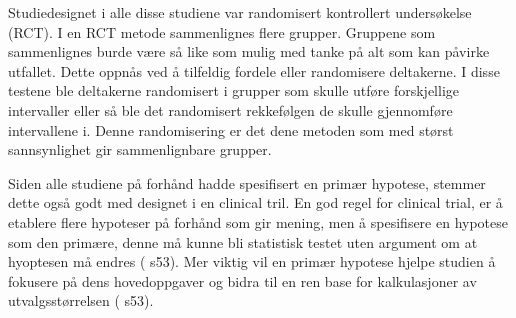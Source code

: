 \documentclass[
]{book}
\begin{document}
Studiedesignet i alle disse studiene var randomisert kontrollert undersøkelse (RCT). I en RCT metode sammenlignes flere grupper. Gruppene som sammenlignes burde være så like som mulig med tanke på alt som kan påvirke utfallet. Dette oppnås ved å tilfeldig fordele eller randomisere deltakerne. I disse testene ble deltakerne randomisert i grupper som skulle utføre forskjellige intervaller eller så ble det randomisert rekkefølgen de skulle gjennomføre intervallene i. Denne randomisering er det dene metoden som med størst sannsynlighet gir sammenlignbare grupper.

Siden alle studiene på forhånd hadde spesifisert en primær hypotese, stemmer dette også godt med designet i en clinical tril. En god regel for clinical trial, er å etablere flere hypoteser på forhånd som gir mening, men å spesifisere en hypotese som den primære, denne må kunne bli statistisk testet uten argument om at hyoptesen må endres (\citet{hulley2013} s53). Mer viktig vil en primær hypotese hjelpe studien å fokusere på dens hovedoppgaver og bidra til en ren base for kalkulasjoner av utvalgsstørrelsen (\citet{hulley2013} s53).
\end{document}
